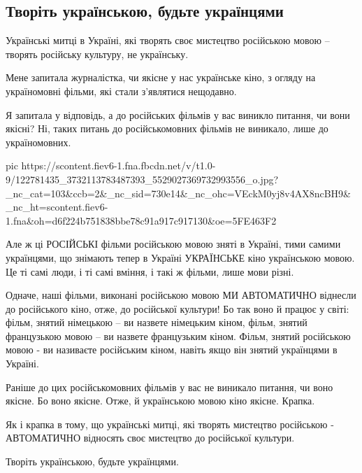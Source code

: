  
 
 
 
 
 
\subsection{Творіть українською, будьте українцями}
\label{sec:29_10_2020.fb.nitsoi_larysa.1.tvorit_ukrainskoju}

Українські митці в Україні, які творять своє мистецтво російською мовою – творять російську культуру, не українську. 

Мене запитала журналістка, чи якісне у нас українське кіно, з огляду на україномовні фільми, які стали з’являтися нещодавно.

Я запитала у відповідь, а до російських фільмів у вас виникло питання, чи вони
якісні? Ні, таких питань до російськомовних фільмів не виникало, лише до
україномовних.

\ifcmt
pic https://scontent.fiev6-1.fna.fbcdn.net/v/t1.0-9/122781435_3732113783487393_5529027369732993556_o.jpg?_nc_cat=103&ccb=2&_nc_sid=730e14&_nc_ohc=VEckM0yj8v4AX8ncBH9&_nc_ht=scontent.fiev6-1.fna&oh=d6f224b751838bbe78c91a917c917130&oe=5FE463F2
\fi

Але ж ці РОСІЙСЬКІ фільми російською мовою зняті в Україні, тими самими
українцями, що знімають тепер в Україні УКРАЇНСЬКЕ кіно українською мовою. Це
ті самі люди, і ті самі вміння, і такі ж фільми, лише мови різні. 

Одначе, наші фільми, виконані російською мовою МИ АВТОМАТИЧНО віднесли до
російського кіно, отже, до російської культури! Бо так воно й працює у світі:
фільм, знятий німецькою – ви назвете німецьким кіном, фільм, знятий французькою
мовою – ви назвете французьким кіном. Фільм, знятий російською мовою - ви
називаєте російським кіном, навіть якщо він знятий українцями в Україні. 

Раніше до цих російськомовних фільмів у вас не виникало питання, чи воно
якісне. Бо воно якісне. Отже, й українською мовою кіно якісне. Крапка.

Як і крапка в тому, що українські митці, які творять мистецтво російською -
АВТОМАТИЧНО відносять своє мистецтво до російської культури. 

Творіть українською, будьте українцями.
